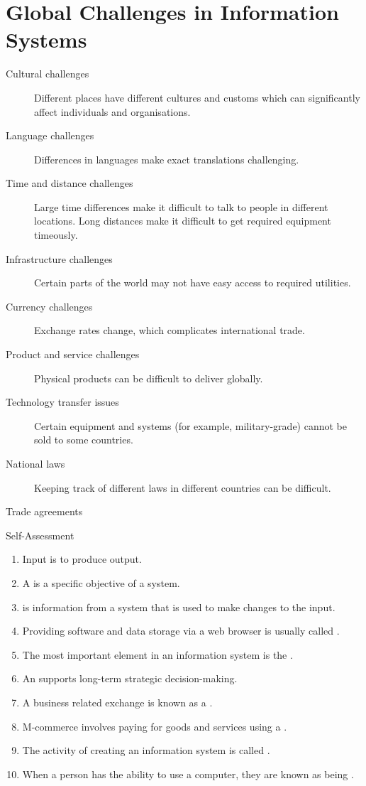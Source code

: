 \documentclass[\main/notes.tex]{subfiles}
\begin{document}
			\section{Global Challenges in Information Systems}
				\begin{description}
					\item[Cultural challenges] Different places have different cultures and customs which can significantly affect individuals and organisations. 
					\item[Language challenges] Differences in languages make exact translations challenging.
					\item[Time and distance challenges] Large time differences make it difficult to talk to people in different locations. Long distances make it difficult to get required equipment timeously.
					\item[Infrastructure challenges] Certain parts of the world may not have easy access to required utilities.
					\item[Currency challenges] Exchange rates change, which complicates international trade.
					\item[Product and service challenges] Physical products can be difficult to deliver globally.
					\item[Technology transfer issues] Certain equipment and systems (for example, military-grade) cannot be sold to some countries.
					\item[National laws] Keeping track of different laws in different countries can be difficult.
					\item[Trade agreements] 
				\end{description}
				\pagebreak
				\begin{exercise}{Self-Assessment}
					\begin{enumerate}
						\item Input is  to produce output.
						\item A  is a specific objective of a system.
						\item {} is information from a system that is used to make changes to the input.
						\item Providing software and data storage via a web browser is usually called .
						\item The most important element in an information system is the .
						\item An  supports long-term strategic decision-making.
						\item A business related exchange is known as a .
						\item M-commerce involves paying for goods and services using a .
						\item The activity of creating an information system is called .
						\item When a person has the ability to use a computer, they are known as being .
					\end{enumerate}
				\end{exercise}
\end{document}
